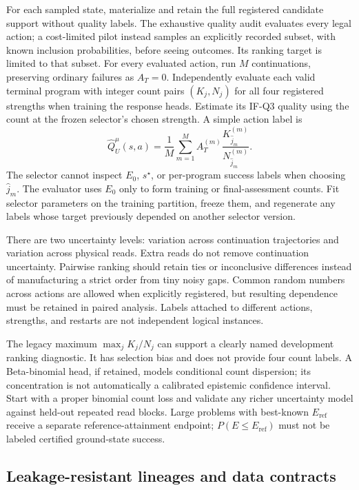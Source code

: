 For each sampled state, materialize and retain the full registered candidate support without quality labels. The exhaustive quality audit evaluates every legal action; a cost-limited pilot instead samples an explicitly recorded subset, with known inclusion probabilities, before seeing outcomes. Its ranking target is limited to that subset. For every evaluated action, run $M$ continuations, preserving ordinary failures as $A_T=0$. Independently evaluate each valid terminal program with integer count pairs $(K_j,N_j)$ for all four registered strengths when training the response heads. Estimate its IF-Q3 quality using the count at the frozen selector's chosen strength. A simple action label is
\[
 \widehat Q_U^\mu(s,a)=\frac1M\sum_{m=1}^{M}
      A_T^{(m)}\frac{K^{(m)}_{\widehat j_m}}{N^{(m)}_{\widehat j_m}}.
\]
The selector cannot inspect $E_0$, $s^\star$, or per-program success labels when choosing $\widehat j_m$. The evaluator uses $E_0$ only to form training or final-assessment counts. Fit selector parameters on the training partition, freeze them, and regenerate any labels whose target previously depended on another selector version.

There are two uncertainty levels: variation across continuation trajectories and variation across physical reads. Extra reads do not remove continuation uncertainty. Pairwise ranking should retain ties or inconclusive differences instead of manufacturing a strict order from tiny noisy gaps. Common random numbers across actions are allowed when explicitly registered, but resulting dependence must be retained in paired analysis. Labels attached to different actions, strengths, and restarts are not independent logical instances.

The legacy maximum $\max_j K_j/N_j$ can support a clearly named development ranking diagnostic. It has selection bias and does not provide four count labels. A Beta-binomial head, if retained, models conditional count dispersion; its concentration is not automatically a calibrated epistemic confidence interval. Start with a proper binomial count loss and validate any richer uncertainty model against held-out repeated read blocks. Large problems with best-known $E_{\mathrm{ref}}$ receive a separate reference-attainment endpoint; $P(E\le E_{\mathrm{ref}})$ must not be labeled certified ground-state success.

\subsection{Leakage-resistant lineages and data contracts}
\label{data:splits}

